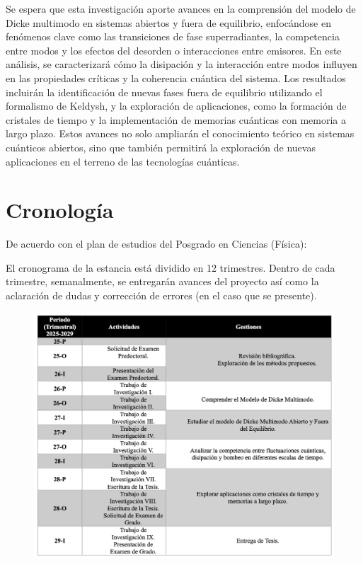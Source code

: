 \documentclass[onecolumn,notitlepage,letterpaper,aps,pra,12pt]{article}
\numberwithin{equation}{section}
\begin{document}
Se espera que esta investigación aporte avances en la comprensión del modelo de Dicke multimodo en sistemas abiertos y fuera de equilibrio, enfocándose en fenómenos clave como las transiciones de fase superradiantes, la competencia entre modos y los efectos del desorden o interacciones entre emisores. En este análisis, se caracterizará cómo la disipación y la interacción entre modos influyen en las propiedades críticas y la coherencia cuántica del sistema. Los resultados incluirán la identificación de nuevas fases fuera de equilibrio utilizando el formalismo de Keldysh, y la exploración de aplicaciones, como la formación de cristales de tiempo y la implementación de memorias cuánticas con memoria a largo plazo. Estos avances no solo ampliarán el conocimiento teórico en sistemas cuánticos abiertos, sino que también permitirá la exploración de nuevas aplicaciones en el terreno de las tecnologías cuánticas.

\section{Cronología}

De acuerdo con el plan de estudios del  Posgrado en Ciencias (Física):

\noindent El cronograma de la estancia está dividido en 12 trimestres. Dentro de cada trimestre, semanalmente, se entregarán avances del proyecto así como la aclaración de dudas y corrección de errores (en el caso que se presente). 

\begin{figure}[H]
    \centering
    \includegraphics[width=1\linewidth]{Images/Tabla Cronologia.png}

\end{figure}
\end{document}
